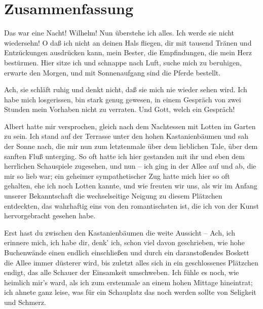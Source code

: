 

\begingroup
\let\clearpage\relax
\let\cleardoublepage\relax
\let\cleardoublepage\relax

\chapter*{Zusammenfassung} %

Das war eine Nacht! Wilhelm! Nun überstehe ich alles. Ich werde sie nicht wiedersehn! O daß ich nicht an deinen Hals fliegen, dir mit tausend Tränen und Entzückungen ausdrücken kann, mein Bester, die Empfindungen, die mein Herz bestürmen. Hier sitze ich und schnappe nach Luft, suche mich zu beruhigen, erwarte den Morgen, und mit Sonnenaufgang sind die Pferde bestellt.

Ach, sie schläft ruhig und denkt nicht, daß sie mich nie wieder sehen wird. Ich habe mich losgerissen, bin stark genug gewesen, in einem Gespräch von zwei Stunden mein Vorhaben nicht zu verraten. Und Gott, welch ein Gespräch!

Albert hatte mir versprochen, gleich nach dem Nachtessen mit Lotten im Garten zu sein. Ich stand auf der Terrasse unter den hohen Kastanienbäumen und sah der Sonne nach, die mir nun zum letztenmale über dem lieblichen Tale, über dem sanften Fluß unterging. So oft hatte ich hier gestanden mit ihr und eben dem herrlichen Schauspiele zugesehen, und nun – ich ging in der Allee auf und ab, die mir so lieb war; ein geheimer sympathetischer Zug hatte mich hier so oft gehalten, ehe ich noch Lotten kannte, und wie freuten wir uns, als wir im Anfang unserer Bekanntschaft die wechselseitige Neigung zu diesem Plätzchen entdeckten, das wahrhaftig eins von den romantischsten ist, die ich von der Kunst hervorgebracht gesehen habe.

Erst hast du zwischen den Kastanienbäumen die weite Aussicht – Ach, ich erinnere mich, ich habe dir, denk' ich, schon viel davon geschrieben, wie hohe Buchenwände einen endlich einschließen und durch ein daranstoßendes Boskett die Allee immer düsterer wird, bis zuletzt alles sich in ein geschlossenes Plätzchen endigt, das alle Schauer der Einsamkeit umschweben. Ich fühle es noch, wie heimlich mir's ward, als ich zum erstenmale an einem hohen Mittage hineintrat; ich ahnete ganz leise, was für ein Schauplatz das noch werden sollte von Seligkeit und Schmerz.

\endgroup

\vfill
